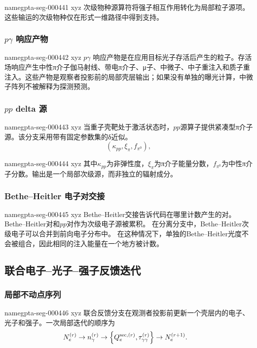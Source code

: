 \documentclass[twocolumn]{aastex702}
\makeatletter
\providecommand{\gptareaderanchor}[1]{\pdfdest name{#1} xyz}%
\providecommand{\gptareaderanchor}[1]{\special{pdf:dest (#1) [ @thispage /XYZ @xpos @ypos null ]}}%
\makeatother
\begin{document}
\gptareaderanchor{gpta-seg-000441}%
次级物种源算符将强子相互作用转化为局部粒子源项。这些输运的次级物种仅在形式一维路径中得到支持。

\subsubsection{\texorpdfstring{\(p\gamma\)}{p-gamma} 响应产物}


\gptareaderanchor{gpta-seg-000442}%
\(p\gamma\) 响应产物是在应用目标光子存活后产生的粒子。存活场响应产生中性π介子伽马射线、带电π介子、μ子、中微子、中子重注入和质子重注入。这些产物是观察者投影前的局部壳层输出；如果没有单独的曝光计算，中微子阵列不被解释为探测预测。

\subsubsection{\texorpdfstring{\(pp\)}{pp} delta 源}


\gptareaderanchor{gpta-seg-000443}%
当重子壳靶处于激活状态时，\(pp\)源算子提供紧凑型π介子源。该分支采用带有固定参数集的δ近似。
\begin{equation}
\left(\kappa_{pp},\xi_\pi,f_{\pi^0}\right),
\end{equation}

\gptareaderanchor{gpta-seg-000444}%
其中\(\kappa_{pp}\)为非弹性度，\(\xi_\pi\)为π介子能量分数，\(f_{\pi^0}\)为中性π介子分数。输出是一个局部次级源，而非独立的辐射成分。

\subsubsection{Bethe--Heitler 电子对交接}


\gptareaderanchor{gpta-seg-000445}%
Bethe--Heitler交接告诉代码在哪里计数产生的对。
Bethe--Heitler对和\(pp\)对作为次级电子源被累积。
在分离分支中，Bethe--Heitler次级电子可以合并到前向电子分布中。
在这种情况下，单独的Bethe--Heitler光度不会被组合，因此相同的注入能量在一个地方被计数。

\subsection{联合电子--光子--强子反馈迭代}

\subsubsection{局部不动点序列}


\gptareaderanchor{gpta-seg-000446}%
联合反馈分支在观测者投影前更新一个壳层内的电子、光子和强子。一次局部迭代的顺序为
\begin{equation}
\begin{aligned}
N_e^{(r)}
&\rightarrow n_\gamma^{(r)}
\rightarrow
\left\{Q_e^{{\rm sec},(r)},\tau_{\gamma\gamma}^{(r)}\right\}
\rightarrow N_e^{(r+1)}.
\end{aligned}
\end{equation}
\end{document}
